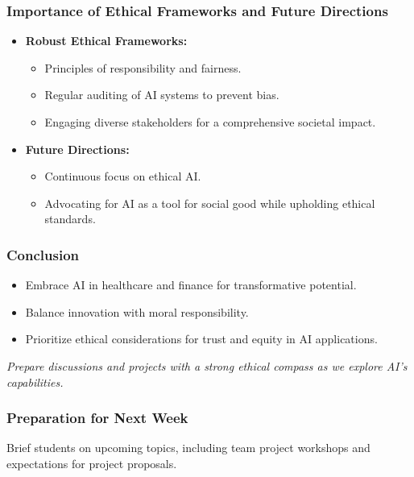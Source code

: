 \documentclass[aspectratio=169]{beamer}
\begin{document}
\begin{frame}[fragile]
    \frametitle{Importance of Ethical Frameworks and Future Directions}
    
    \begin{itemize}
        \item \textbf{Robust Ethical Frameworks:}
            \begin{itemize}
                \item Principles of responsibility and fairness.
                \item Regular auditing of AI systems to prevent bias.
                \item Engaging diverse stakeholders for a comprehensive societal impact.
            \end{itemize}
        
        \item \textbf{Future Directions:}
            \begin{itemize}
                \item Continuous focus on ethical AI.
                \item Advocating for AI as a tool for social good while upholding ethical standards.
            \end{itemize}
    \end{itemize}
\end{frame}

\begin{frame}[fragile]
    \frametitle{Conclusion}
    
    \begin{itemize}
        \item Embrace AI in healthcare and finance for transformative potential.
        \item Balance innovation with moral responsibility.
        \item Prioritize ethical considerations for trust and equity in AI applications.
    \end{itemize}
    
    \textit{Prepare discussions and projects with a strong ethical compass as we explore AI's capabilities.}
\end{frame}

\begin{frame}[fragile]
    \frametitle{Preparation for Next Week}
    Brief students on upcoming topics, including team project workshops and expectations for project proposals.
\end{frame}
\end{document}
